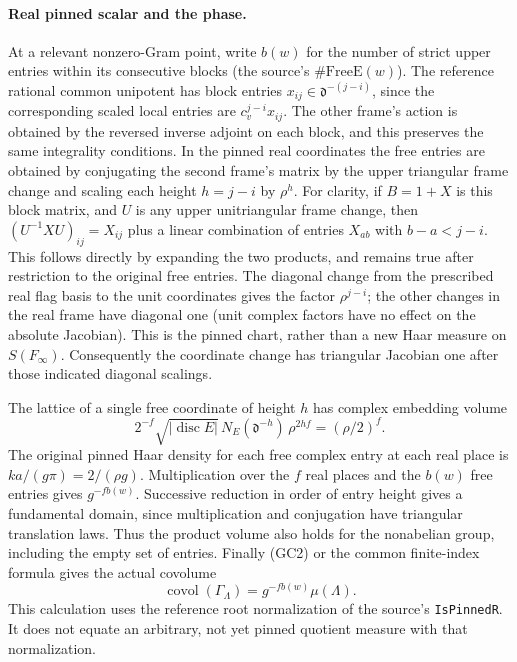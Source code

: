 \paragraph{Real pinned scalar and the phase.}
At a relevant nonzero-Gram point, write \(b(w)\) for the
number of strict upper entries within its consecutive
blocks (the source's \(\#\mathrm{FreeE}(w)\)).
The reference rational common unipotent has block entries
\(x_{ij}\in\mathfrak d^{-(j-i)}\), since the corresponding
scaled local entries are \(c_v^{j-i}x_{ij}\). The other
frame's action is obtained by the reversed inverse
adjoint on each block, and this preserves the same
integrality conditions. In the pinned real coordinates
the free entries are obtained by conjugating the second
frame's matrix by the upper triangular frame change and
scaling each height \(h=j-i\) by \(\rho^h\).
For clarity, if \(B=1+X\) is this block matrix, and \(U\)
is any upper unitriangular frame change, then
\((U^{-1}XU)_{ij}=X_{ij}\) plus a linear combination of
entries \(X_{ab}\) with \(b-a<j-i\).
This follows directly by expanding the two products, and
remains true after restriction to the original free
entries. The diagonal change from the prescribed real
flag basis to the unit coordinates gives the factor
\(\rho^{j-i}\); the other changes in the real frame have
diagonal one (unit complex factors have no effect on
the absolute Jacobian). This is the pinned chart, rather
than a new Haar measure on \(S(F_\infty)\).
Consequently the coordinate change has triangular Jacobian
one after those indicated diagonal scalings.

The lattice of a single free coordinate of height \(h\)
has complex embedding volume
\[
   2^{-f}\sqrt{|\operatorname{disc}E|}\,
   N_E(\mathfrak d^{-h})\,\rho^{2hf}
      =(\rho/2)^f.
\]
The original pinned Haar density for each free complex entry
at each real place is \(ka/(g\pi)=2/(\rho g)\).
Multiplication over the \(f\) real places and the \(b(w)\)
free entries gives \(g^{-fb(w)}\).
Successive reduction in order of entry height gives a
fundamental domain, since multiplication and conjugation
have triangular translation laws. Thus the product volume
also holds for the nonabelian group, including the empty
set of entries. Finally (GC2) or the common finite-index
formula gives the actual covolume
\[
         \operatorname{covol}(\Gamma_\Lambda)
                        =g^{-fb(w)}\mu(\Lambda).
 \tag{GC8}
\]
This calculation uses the reference root normalization of
the source's \texttt{IsPinnedR}. It does not equate an
arbitrary, not yet pinned quotient measure with that
normalization.

